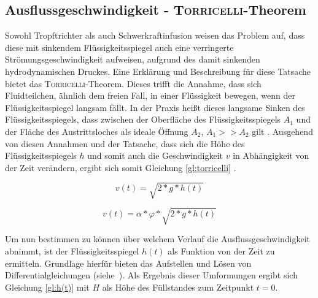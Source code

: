 \subsection{Ausflussgeschwindigkeit - \textsc{Torricelli}-Theorem}
\label{sec:torricelli}
Sowohl Tropftrichter als auch Schwerkraftinfusion weisen das Problem auf, dass diese mit sinkendem Flüssigkeitsspiegel auch eine verringerte Strömungsgeschwindigkeit aufweisen, aufgrund des damit sinkenden hydrodynamischen Druckes. 
Eine Erklärung und Beschreibung für diese Tatsache bietet das \textsc{Torricelli}-Theorem. Dieses trifft die Annahme, dass sich Fluidteilchen, ähnlich dem freien Fall, in einer Flüssigkeit bewegen, wenn der Flüssigkeitsspiegel langsam fällt. In der Praxis heißt dieses langsame Sinken des Flüssigkeitsspiegels, dass zwischen der Oberfläche des Flüssigkeitsspiegels $A_1$ und der Fläche des Austrittsloches als ideale Öffnung $A_2$, $A_1>>A_2$ gilt \cite{Kurzweil.2008}. Ausgehend von diesen Annahmen und der Tatsache, dass sich die Höhe des Flüssigkeitsspiegels $h$ und somit auch die Geschwindigkeit $v$ in Abhängigkeit von der Zeit verändern, ergibt sich somit Gleichung \eqref{gl:torricelli} \cite{tecscience.2019}.

\begin{equation}
\label{gl:torricelli}
	v(t) = \sqrt{2*g*h(t)}
\end{equation}


\begin{equation}
	\label{gl:torricelli_real}
	v(t) = \alpha*\varphi*\sqrt{2*g*h(t)}
\end{equation}


Um nun bestimmen zu können über welchem Verlauf die Ausflussgeschwindigkeit abnimmt, ist der Flüssigkeitsspiegel $h(t)$ als Funktion von der Zeit zu ermitteln. Grundlage hierfür bieten das Aufstellen und Lösen von Differentialgleichungen
\mbox{(siehe \cite{tecscience.2019})}. Als Ergebnis dieser Umformungen ergibt sich Gleichung \eqref{gl:h(t)} mit $H$ als Höhe des Füllstandes zum Zeitpunkt $t=0$.

